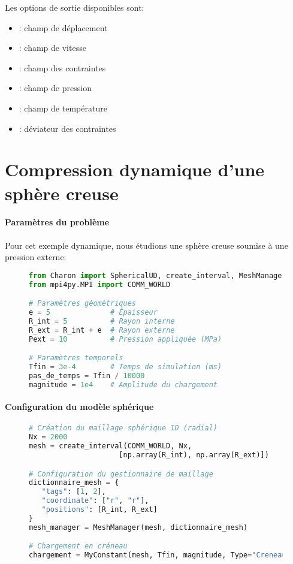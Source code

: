 \documentclass[10pt]{book}
\begin{document}
Les options de sortie disponibles sont:
\begin{itemize}
\item {}: champ de déplacement
\item {}: champ de vitesse
\item {}: champ des contraintes
\item {}: champ de pression
\item {}: champ de température
\item {}: déviateur des contraintes
\end{itemize}

\clearpage

\section{Compression dynamique d'une sphère creuse}\label{Section:Compression dynamique d'une sphère creuse}

\paragraph{Paramètres du problème} Pour cet exemple dynamique, nous étudions une sphère creuse soumise à une pression externe:

\begin{figure}[h!]
\begin{lstlisting}[language=python]
from Charon import SphericalUD, create_interval, MeshManager
from mpi4py.MPI import COMM_WORLD

# Paramètres géométriques
e = 5              # Épaisseur
R_int = 5          # Rayon interne
R_ext = R_int + e  # Rayon externe
Pext = 10          # Pression appliquée (MPa)

# Paramètres temporels
Tfin = 3e-4        # Temps de simulation (ms)
pas_de_temps = Tfin / 10000
magnitude = 1e4    # Amplitude du chargement
\end{lstlisting}
\end{figure}

\paragraph{Configuration du modèle sphérique}

\begin{figure}[h!]
\begin{lstlisting}[language=python]
# Création du maillage sphérique 1D (radial)
Nx = 2000
mesh = create_interval(COMM_WORLD, Nx, 
                     [np.array(R_int), np.array(R_ext)])

# Configuration du gestionnaire de maillage
dictionnaire_mesh = {
   "tags": [1, 2], 
   "coordinate": ["r", "r"], 
   "positions": [R_int, R_ext]
}
mesh_manager = MeshManager(mesh, dictionnaire_mesh)

# Chargement en créneau
chargement = MyConstant(mesh, Tfin, magnitude, Type="Creneau")
\end{lstlisting}
\end{figure}
\end{document}
